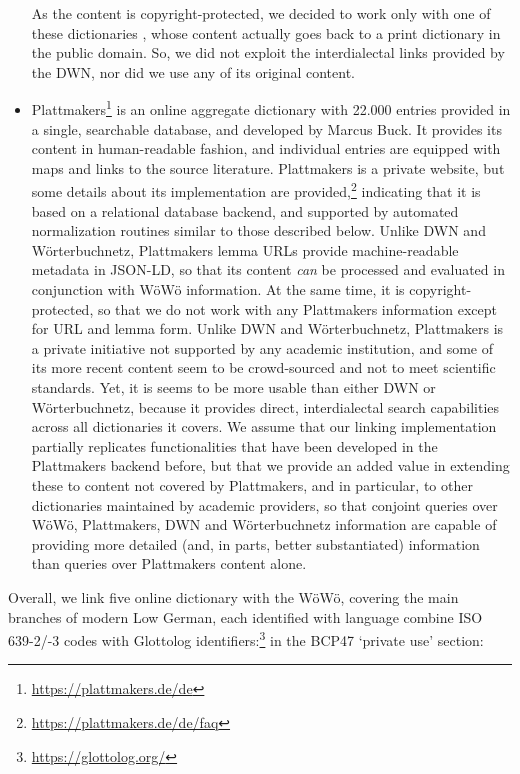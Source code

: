 \begin{itemize}
As the content is copyright-protected, we decided to work only with one of these dictionaries \citep{muller1904reuter}, whose content actually goes back to a print dictionary in the public domain. So, we did not exploit the interdialectal links provided by the DWN, nor did we use any of its original content.
\item Plattmakers\footnote{
    \url{https://plattmakers.de/de}
} is an online aggregate dictionary with 22.000 entries provided in a single, searchable database, and developed by Marcus Buck. It provides its content in human-readable fashion, and individual entries are equipped with maps and links to the source literature. Plattmakers is a private website, but some details about its implementation are provided,\footnote{\url{https://plattmakers.de/de/faq}} indicating that it is based on a relational database backend, and supported by automated normalization routines similar to those described below. Unlike DWN and Wörterbuchnetz, Plattmakers lemma URLs provide machine-readable metadata in JSON-LD, so that its content \emph{can} be processed and evaluated in conjunction with WöWö information. At the same time, it is copyright-protected, so that we do not work with any Plattmakers information except for URL and lemma form. Unlike DWN and Wörterbuchnetz, Plattmakers is a private initiative not supported by any academic institution, and some of its more recent content seem to be crowd-sourced and not to meet scientific standards. Yet, it is seems to be more usable than either DWN or Wörterbuchnetz, because it provides direct, interdialectal search capabilities across all dictionaries it covers. We assume that our linking implementation partially replicates functionalities that have been developed in the Plattmakers backend before, but that we provide an added value in extending these to content not covered by Plattmakers, and in particular, to other dictionaries maintained by academic providers, so that conjoint queries over WöWö, Plattmakers, DWN and Wörterbuchnetz information are capable of providing more detailed (and, in parts, better substantiated) information than queries over Plattmakers content alone.
\end{itemize}

Overall, we link five online dictionary with the WöWö, covering the main branches of modern Low German, each identified with language combine ISO 639-2/-3 codes with Glottolog identifiers:\footnote{\url{https://glottolog.org/}} in the BCP47 `private use' section: 

